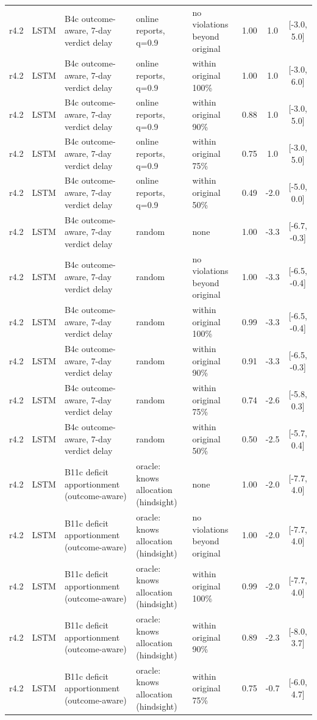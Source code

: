 \documentclass[10pt,onecolumn,letterpaper]{article}
\begin{document}
\begin{longtable}{lllp{4.2cm}p{3.4cm}ccc}
r4.2 & LSTM & B4c outcome-aware, 7-day verdict delay & online reports, q=0.9 & no violations beyond original & 1.00 & 1.0 & [-3.0, 5.0] \\
r4.2 & LSTM & B4c outcome-aware, 7-day verdict delay & online reports, q=0.9 & within original 100\% & 1.00 & 1.0 & [-3.0, 6.0] \\
r4.2 & LSTM & B4c outcome-aware, 7-day verdict delay & online reports, q=0.9 & within original 90\% & 0.88 & 1.0 & [-3.0, 5.0] \\
r4.2 & LSTM & B4c outcome-aware, 7-day verdict delay & online reports, q=0.9 & within original 75\% & 0.75 & 1.0 & [-3.0, 5.0] \\
r4.2 & LSTM & B4c outcome-aware, 7-day verdict delay & online reports, q=0.9 & within original 50\% & 0.49 & -2.0 & [-5.0, 0.0] \\
r4.2 & LSTM & B4c outcome-aware, 7-day verdict delay & random & none & 1.00 & -3.3 & [-6.7, -0.3] \\
r4.2 & LSTM & B4c outcome-aware, 7-day verdict delay & random & no violations beyond original & 1.00 & -3.3 & [-6.5, -0.4] \\
r4.2 & LSTM & B4c outcome-aware, 7-day verdict delay & random & within original 100\% & 0.99 & -3.3 & [-6.5, -0.4] \\
r4.2 & LSTM & B4c outcome-aware, 7-day verdict delay & random & within original 90\% & 0.91 & -3.3 & [-6.5, -0.3] \\
r4.2 & LSTM & B4c outcome-aware, 7-day verdict delay & random & within original 75\% & 0.74 & -2.6 & [-5.8, 0.3] \\
r4.2 & LSTM & B4c outcome-aware, 7-day verdict delay & random & within original 50\% & 0.50 & -2.5 & [-5.7, 0.4] \\
r4.2 & LSTM & B11c deficit apportionment (outcome-aware) & oracle: knows allocation (hindsight) & none & 1.00 & -2.0 & [-7.7, 4.0] \\
r4.2 & LSTM & B11c deficit apportionment (outcome-aware) & oracle: knows allocation (hindsight) & no violations beyond original & 1.00 & -2.0 & [-7.7, 4.0] \\
r4.2 & LSTM & B11c deficit apportionment (outcome-aware) & oracle: knows allocation (hindsight) & within original 100\% & 0.99 & -2.0 & [-7.7, 4.0] \\
r4.2 & LSTM & B11c deficit apportionment (outcome-aware) & oracle: knows allocation (hindsight) & within original 90\% & 0.89 & -2.3 & [-8.0, 3.7] \\
r4.2 & LSTM & B11c deficit apportionment (outcome-aware) & oracle: knows allocation (hindsight) & within original 75\% & 0.75 & -0.7 & [-6.0, 4.7] \\

\end{longtable}
\end{document}
